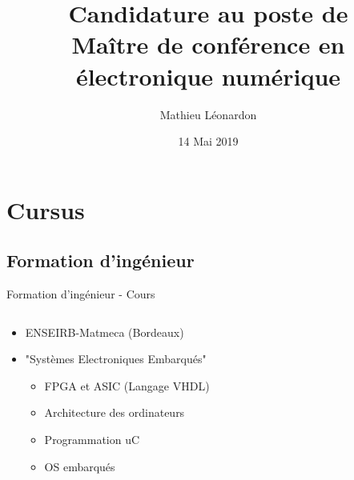 \documentclass[t,compress,mathserif,12pt,xcolor=dvipsnames]{beamer}
\title{\textbf{Candidature au poste de \\ Maître de conférence en électronique numérique}}
\author[Mathieu Léonardon\hspace{3.01cm}\url{https://mathieuleonardon.com}\hspace{1.0cm}{mathieu.leonardon@ims-bordeaux.fr}]{\Large{Mathieu Léonardon}\vspace{-0.5cm}}
\date{14 Mai 2019}
\begin{document}
\begin{frame}[t]
\titlepage
\end{frame}

\section{Cursus}
\subsection{Formation d'ingénieur}
\begin{frame}[t]{Formation d'ingénieur - Cours}
  \begin{minipage}[t][5.0cm][t]{\textwidth}
    \begin{columns}[T]
      \begin{column}{0.63\textwidth}
        \begin{itemize}
          \item<+-> ENSEIRB-Matmeca (Bordeaux)
          \item<+-> "Systèmes Electroniques Embarqués"
          \begin{itemize}
            \item<+-> FPGA et ASIC (Langage VHDL)
            \item<+-> Architecture des ordinateurs
            \item<+-> Programmation uC
            \item<+-> OS embarqués
          \end{itemize}
        \end{itemize}
      \end{column}
      \begin{column}{0.04\textwidth}


\end{column}
\end{columns}
\end{minipage}
\end{frame}
\end{document}
